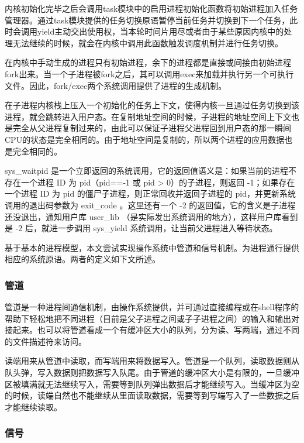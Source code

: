 内核初始化完毕之后会调用task模块中的启用进程初始化函数将初始进程加入任务管理器。通过task模块提供的任务切换原语暂停当前任务并切换到下一个任务，此时会调用yield主动交出使用权，当本轮时间片用尽或者由于某些原因内核中的处理无法继续的时候，就会在内核中调用此函数触发调度机制并进行任务切换。

在内核中手动生成的进程只有初始进程，余下的进程都是直接或间接由初始进程fork出来。当一个子进程被fork之后，其可以调用exec来加载并执行另一个可执行文件。因此，fork/exec两个系统调用提供了进程的生成机制。

在子进程内核栈上压入一个初始化的任务上下文，使得内核一旦通过任务切换到该进程，就会跳转进入用户态。在复制地址空间的时候，子进程的地址空间上下文也是完全从父进程复制过来的，由此可以保证子进程父进程回到用户态的那一瞬间CPU的状态是完全相同的。由于地址空间是复制的，所以两个进程的应用数据也是完全相同的。

sys\_waitpid 是一个立即返回的系统调用，它的返回值语义是：如果当前的进程不存在一个进程 ID 为 pid（pid==-1 或 pid > 0）的子进程，则返回 -1；如果存在一个进程 ID 为 pid 的僵尸子进程，则正常回收并返回子进程的 pid，并更新系统调用的退出码参数为 exit\_code 。这里还有一个 -2 的返回值，它的含义是子进程还没退出，通知用户库 user\_lib （是实际发出系统调用的地方），这样用户库看到是 -2 后，就进一步调用 sys\_yield 系统调用，让当前父进程进入等待状态。

基于基本的进程模型，本文尝试实现操作系统中管道和信号机制。为进程通行提供相应的系统原语。两者的定义如下文所述。

\subsubsection{管道}


管道是一种进程间通信机制，由操作系统提供，并可通过直接编程或在shell程序的帮助下轻松地把不同进程（目前是父子进程之间或子子进程之间）的输入和输出对接起来。也可以将管道看成一个有缓冲区大小的队列，分为读、写两端，通过不同的文件描述符来访问。

读端用来从管道中读取，而写端用来将数据写入。管道是一个队列，读取数据则从队头弹，写入数据则把数据写入队尾。由于管道的缓冲区大小是有限的，一旦缓冲区被填满就无法继续写入，需要等到队列弹出数据后才能继续写入。当缓冲区为空的时候，读端自然也不能继续从里面读取数据，需要等到写端写入了一些数据之后才能继续读取。

\subsubsection{信号}

